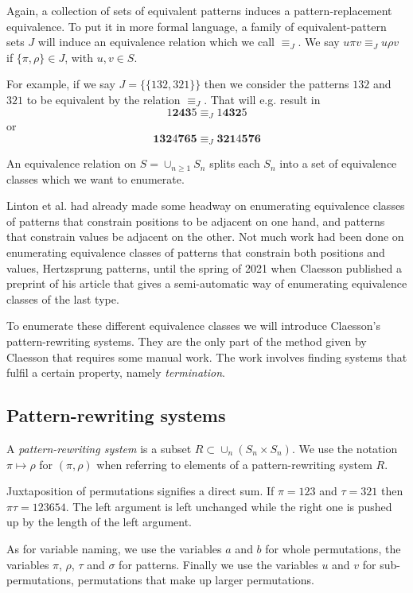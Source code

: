 \documentclass[a4paper, 11pt, english]{article}
\newcommand{\patternrule}{ \mapsto \!}
\theoremstyle{definition}
\newcommand{\Sym}{S}
\begin{document}
Again, a collection of sets of equivalent patterns induces a pattern-replacement equivalence.
To put it in more formal language, a family of equivalent-pattern sets $J$ will induce an equivalence relation
which we call $\equiv_J$. We say $u \pi v \equiv_J u \rho v$ if $\{ \pi, \rho \} \in J$, with $u,v
\in \Sym$.

For example, if we say $J = \{ \{ 132, 321 \} \}$ then we consider the patterns $132$ and $321$ to
be equivalent by the relation $\equiv_J$. That will e.g. result in
\[
    1\bm{243}5 \equiv_J 1\bm{432}5
\]
or
\[
  \bm{132}4\bm{765} \equiv_J \bm{321}4\bm{576}
\]

An equivalence relation on $\Sym = \cup_{n \geq 1} \Sym_n$ splits each $\Sym_n$
into a set of equivalence classes which we want to enumerate. 

Linton et al. had already made some headway on enumerating equivalence classes of patterns that constrain
positions to be adjacent on one hand, and patterns that constrain values be adjacent on the other.
Not much work had been done on enumerating equivalence classes of patterns that constrain both
positions and values, Hertzsprung patterns, until the spring of 2021 when Claesson published a
preprint of his article \cite{claesson:2021} that gives a semi-automatic way of enumerating equivalence classes of the
last type.

To enumerate these different equivalence classes we will introduce Claesson's 
pattern-rewriting systems. They are the only part of the method given by Claesson that requires
some manual work. The work involves finding systems that fulfil a certain property, namely
\emph{termination}.

\subsection{Pattern-rewriting systems}
A \emph{pattern-rewriting system} is a subset $R \subset \cup_{n} (\Sym_n \times \Sym_n)$.
We use the notation $\pi \patternrule \rho$ for $(\pi, \rho)$ when referring
to elements of a pattern-rewriting system $R$. 

Juxtaposition of permutations signifies a direct sum. If $\pi=123$ and
$\tau=321$ then $\pi\tau=123654$. The left argument is left unchanged while the
right one is pushed up by the length of the left argument.

As for variable naming, we use the variables $a$ and $b$ for whole permutations, 
the variables $\pi$, $\rho$, $\tau$ and $\sigma$ for patterns.
Finally we use the variables $u$ and $v$ for sub-permutations, permutations that make up larger
permutations.
\end{document}
